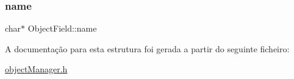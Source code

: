 \hypertarget{struct_object_field_abcb295af73c70e33c15fac95467628c0}{}\label{struct_object_field_abcb295af73c70e33c15fac95467628c0} 
\subsubsection{\texorpdfstring{name}{name}}
{\footnotesize\ttfamily char$\ast$ Object\+Field\+::name}



A documentação para esta estrutura foi gerada a partir do seguinte ficheiro\+:\begin{DoxyCompactItemize}
\item 
\hyperlink{object_manager_8h}{object\+Manager.\+h}\end{DoxyCompactItemize}
